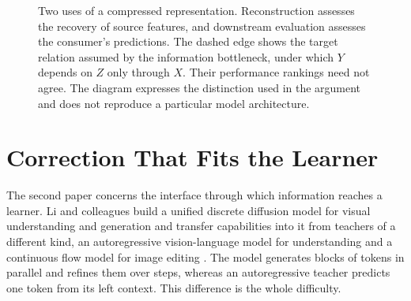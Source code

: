 \documentclass[11pt]{article}
\theoremstyle{remark}
\begin{document}
\begin{figure}[tbp]
\centering
{}
\caption{Two uses of a compressed representation. Reconstruction assesses the recovery of source features, and downstream evaluation assesses the consumer's predictions. The dashed edge shows the target relation assumed by the information bottleneck, under which $Y$ depends on $Z$ only through $X$. Their performance rankings need not agree. The diagram expresses the distinction used in the argument and does not reproduce a particular model architecture.}
\label{fig:representation-routes}
\end{figure}

\section{Correction That Fits the Learner}

The second paper concerns the interface through which information reaches a learner. Li and colleagues build a unified discrete diffusion model for visual understanding and generation and transfer capabilities into it from teachers of a different kind, an autoregressive vision-language model for understanding and a continuous flow model for image editing \cite{li2026}. The model generates blocks of tokens in parallel and refines them over steps, whereas an autoregressive teacher predicts one token from its left context. This difference is the whole difficulty.
\end{document}
